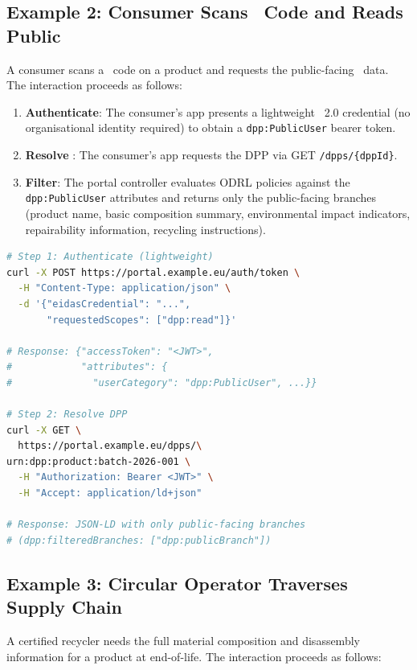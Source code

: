 \subsection{Example 2: Consumer Scans \QR\ Code and Reads Public \DPP}

A consumer scans a \QR\ code on a product and requests the public-facing \DPP\
data. The interaction proceeds as follows:

\begin{enumerate}
\item \textbf{Authenticate}: The consumer's app presents a lightweight
\eIDAS~2.0 credential (no organisational identity required) to obtain a
\texttt{dpp:PublicUser} bearer token.
\item \textbf{Resolve \DPP}: The consumer's app requests the DPP via GET
\texttt{/dpps/\{dppId\}}.
\item \textbf{Filter}: The portal controller evaluates ODRL policies against the
\texttt{dpp:PublicUser} attributes and returns only the public-facing branches
(product name, basic composition summary, environmental impact indicators,
repairability information, recycling instructions).
\end{enumerate}

\begin{lstlisting}[language=bash,breaklines=true,breakatwhitespace=true]
# Step 1: Authenticate (lightweight)
curl -X POST https://portal.example.eu/auth/token \
  -H "Content-Type: application/json" \
  -d '{"eidasCredential": "...",
       "requestedScopes": ["dpp:read"]}'

# Response: {"accessToken": "<JWT>",
#            "attributes": {
#              "userCategory": "dpp:PublicUser", ...}}

# Step 2: Resolve DPP
curl -X GET \
  https://portal.example.eu/dpps/\
urn:dpp:product:batch-2026-001 \
  -H "Authorization: Bearer <JWT>" \
  -H "Accept: application/ld+json"

# Response: JSON-LD with only public-facing branches
# (dpp:filteredBranches: ["dpp:publicBranch"])
\end{lstlisting}

\subsection{Example 3: Circular Operator Traverses Supply Chain}

A certified recycler needs the full material composition and disassembly
information for a product at end-of-life. The interaction proceeds as follows:

